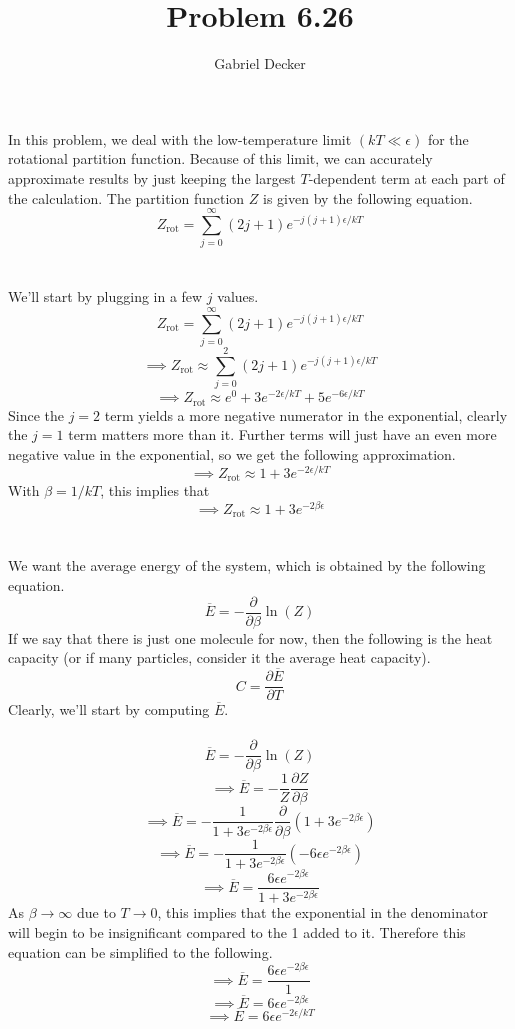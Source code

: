 \documentclass[12pt]{article}
\title{Problem 6.26}
\author{Gabriel Decker}
\newcommand{\partDeriv}[2]{\frac{\partial #1}{\partial #2}}
\begin{document}
\maketitle
\begin{flushleft}

In this problem, we deal with the low-temperature limit $(kT\ll\epsilon)$ for the rotational partition function. Because of this limit, we can accurately approximate results by just keeping the largest $T$-dependent term at each part of the calculation.
The partition function $Z$ is given by the following equation.
\begin{equation}
    Z_\text{rot}=\sum_{j=0}^\infty(2j+1)e^{-j(j+1)\epsilon/kT}
\end{equation}\\~\\

We'll start by plugging in a few $j$ values.
$$Z_\text{rot}=\sum_{j=0}^\infty(2j+1)e^{-j(j+1)\epsilon/kT}$$
$$\implies Z_\text{rot}\approx\sum_{j=0}^2(2j+1)e^{-j(j+1)\epsilon/kT}$$
$$\implies Z_\text{rot}\approx e^{0}+3e^{-2\epsilon/kT}+5e^{-6\epsilon/kT}$$
Since the $j=2$ term yields a more negative numerator in the exponential, clearly the $j=1$ term matters more than it. Further terms will just have an even more negative value in the exponential, so we get the following approximation.
$$\implies Z_\text{rot}\approx 1+3e^{-2\epsilon/kT}$$
With $\beta=1/kT$, this implies that
$$\implies Z_\text{rot}\approx 1+3e^{-2\beta\epsilon}$$\\~\\

We want the average energy of the system, which is obtained by the following equation.
\begin{equation}
    \overline{E}=-\partDeriv{}{\beta}\ln(Z)
\end{equation}
If we say that there is just one molecule for now, then the following is the heat capacity (or if many particles, consider it the average heat capacity).
\begin{equation}
    C=\partDeriv{\overline{E}}{T}
\end{equation}
Clearly, we'll start by computing $\overline{E}$.\\~\\

$$\overline{E}=-\partDeriv{}{\beta}\ln(Z)$$
$$\implies\overline{E}=-\frac{1}{Z}\partDeriv{Z}{\beta}$$
$$\implies\overline{E}=-\frac{1}{1+3e^{-2\beta\epsilon}}\partDeriv{}{\beta}(1+3e^{-2\beta\epsilon})$$
$$\implies\overline{E}=-\frac{1}{1+3e^{-2\beta\epsilon}}(-6\epsilon e^{-2\beta\epsilon})$$
$$\implies\overline{E}=\frac{6\epsilon e^{-2\beta\epsilon}}{1+3e^{-2\beta\epsilon}}$$
As $\beta\rightarrow\infty$ due to $T\rightarrow0$, this implies that the exponential in the denominator will begin to be insignificant compared to the 1 added to it. Therefore this equation can be simplified to the following.
$$\implies\overline{E}=\frac{6\epsilon e^{-2\beta\epsilon}}{1}$$
$$\implies\overline{E}=6\epsilon e^{-2\beta\epsilon}$$
$$\implies\overline{E}=6\epsilon e^{-2\epsilon/kT}$$\\~\\


\end{flushleft}
\end{document}
